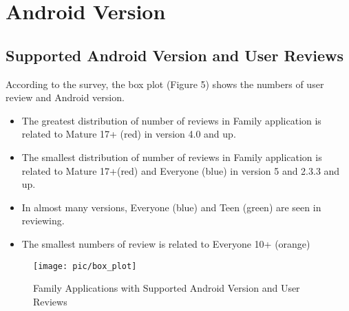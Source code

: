 \section*{Android Version}
\subsection*{Supported Android Version and User Reviews}
 According to the survey, the box plot (Figure 5) shows the numbers of user review and Android version.
 \begin{itemize}
\item The greatest distribution of number of reviews in Family application is related to Mature 17+ (red) in version 4.0 and up.\\
\item The smallest distribution of number of reviews in Family application is related to Mature 17+(red) and Everyone (blue) in version 5 and 2.3.3 and up.\\
\item In almost many versions, Everyone (blue) and Teen (green) are seen in reviewing.\\
\item The smallest numbers of review is related to Everyone 10+ (orange) \\
\end{itemize}
\begin{figure}
\centering
\texttt{[image: pic/box\_plot]}
\caption{Family Applications with Supported Android Version and User Reviews}
\label{fig:5}
\end{figure}




